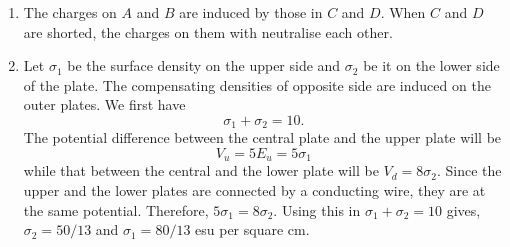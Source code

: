 \documentclass{article}
\begin{document}
\begin{enumerate}
\item The charges on $A$ and $B$ are induced by those in $C$ and $D$. When $C$ 
and $D$ are shorted, the charges on them with neutralise each other.

\item Let $\sigma_1$ be the surface density on the upper side and $\sigma_2$ be
it on the lower side of the plate. The compensating densities of opposite side 
are induced on the outer plates. We first have
\[
\sigma_1 + \sigma_2 = 10.
\]
The potential difference between the central plate and the upper plate will be
\[
V_u = 5E_u = 5\sigma_1
\]
while that between the central and the lower plate will be $V_d = 8\sigma_2$.
Since the upper and the lower plates are connected by a conducting wire, they
are at the same potential. Therefore, $5\sigma_1 = 8\sigma_2$. Using this in
$\sigma_1 + \sigma_2 = 10$ gives, $\sigma_2 = 50/13$ and $\sigma_1 = 80/13$
esu per square cm.
\end{enumerate}
\end{document}
